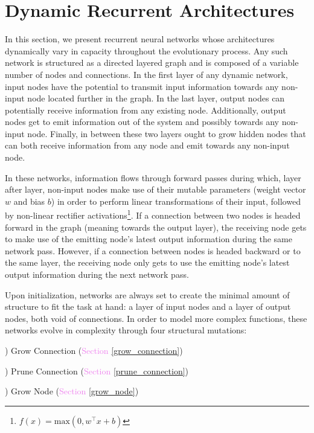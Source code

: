 \documentclass{article} %
\begin{document}
\vspace{-1em}
\section{Dynamic Recurrent Architectures} \label{methods}
\vspace{-1em}

In this section, we present recurrent neural networks whose architectures dynamically vary in capacity throughout the evolutionary process. Any such network is structured as a directed layered graph and is composed of a variable number of nodes and connections. In the first layer of any dynamic network, input nodes have the potential to transmit input information towards any non-input node located further in the graph. In the last layer, output nodes can potentially receive information from any existing node. Additionally, output nodes get to emit information out of the system and possibly towards any non-input node. Finally, in between these two layers ought to grow hidden nodes that can both receive information from any node and emit towards any non-input node.

In these networks, information flows through forward passes during which, layer after layer, non-input nodes make use of their mutable parameters (weight vector $w$ and bias $b$) in order to perform linear transformations of their input, followed by non-linear rectifier activations\footnote{$f(x) = \text{max}(0, w^{\top}x+b)$}. If a connection between two nodes is headed forward in the graph (meaning towards the output layer), the receiving node gets to make use of the emitting node's latest output information during the same network pass. However, if a connection between nodes is headed backward or to the same layer, the receiving node only gets to use the emitting node's latest output information during the next network pass.

Upon initialization, networks are always set to create the minimal amount of structure to fit the task at hand: a layer of input nodes and a layer of output nodes, both void of connections. In order to model more complex functions, these networks evolve in complexity through four structural mutations:

\;\;) Grow Connection (\textcolor{violet}{Section \ref{grow_connection}})

\vspace{-.5em}\;\;) Prune Connection (\textcolor{violet}{Section \ref{prune_connection}})

\vspace{-.5em}\;\;) Grow Node (\textcolor{violet}{Section \ref{grow_node}})
\end{document}

